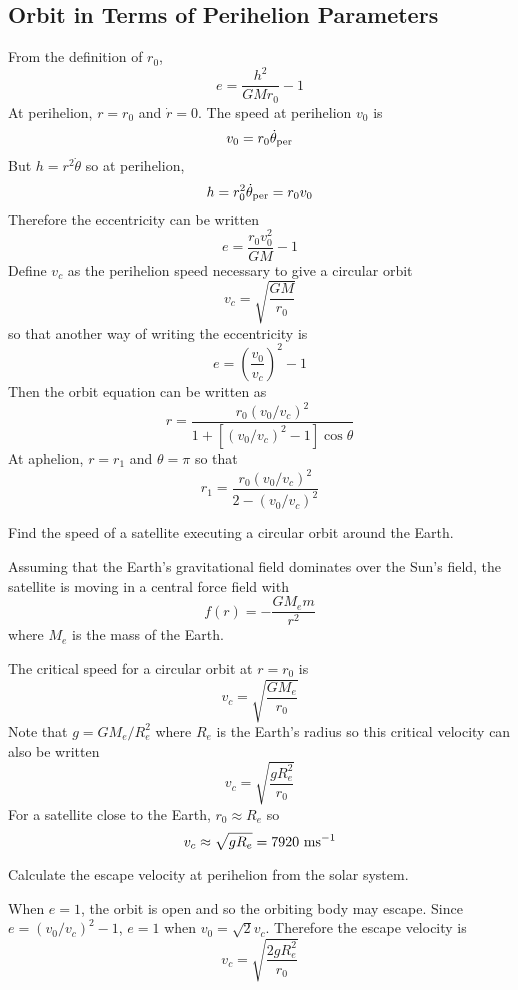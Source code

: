 \subsection{Orbit in Terms of Perihelion Parameters}

From the definition of $r_0$,
$$e=\frac{h^2}{GMr_0}-1$$
At perihelion, $r=r_0$ and $\dot{r}=0$.  The speed at perihelion $v_0$ is
$$v_0=r_0\dot{\theta}_{\rm per}$$
But $h=r^2\dot{\theta}$ so at perihelion,
$$h=r_0^2\dot{\theta}_{\rm per}=r_0v_0$$
Therefore the eccentricity can be written
$$e=\frac{r_0v_0^2}{GM}-1$$
Define $v_c$ as the perihelion speed necessary to give a circular orbit
$$v_c=\sqrt{\frac{GM}{r_0}}$$
so that another way of writing the eccentricity is
$$e=\left(\frac{v_0}{v_c}\right)^2-1$$
Then the orbit equation can be written as
$$r=\frac{r_0\left(v_0/v_c\right)^2}
{1+\left[\left(v_0/v_c\right)^2-1\right]\cos\theta}$$
At aphelion, $r=r_1$ and $\theta=\pi$ so that
$$r_1=\frac{r_0\left(v_0/v_c\right)^2}
{2-\left(v_0/v_c\right)^2}$$

\begin{example}
\problem
Find the speed of a satellite executing a circular orbit around the Earth.

\solution
Assuming that the Earth's gravitational field dominates over the Sun's field,
the satellite is moving in a central force field with
$$f(r)=-\frac{GM_em}{r^2}$$
where $M_e$ is the mass of the Earth.

The critical speed for a circular orbit at $r=r_0$ is
$$v_c=\sqrt{\frac{GM_e}{r_0}}$$
Note that $g=GM_e/R_e^2$ where $R_e$ is the Earth's radius so this
critical velocity can also be written
$$v_c=\sqrt{\frac{gR_e^2}{r_0}}$$
For a satellite close to the Earth, $r_0\approx R_e$ so
$$v_c\approx\sqrt{gR_e}=7920\ \rm ms^{-1}$$
\end{example}

\begin{example}
\problem
Calculate the escape velocity at perihelion from the solar system.

\solution
When $e=1$, the orbit is open and so the orbiting body may escape.  Since
$e=\left(v_0/v_c\right)^2-1$, $e=1$ when $v_0=\sqrt{2}v_c$. 
Therefore the escape velocity is
$$v_c=\sqrt{\frac{2gR_e^2}{r_0}}$$
\end{example}

